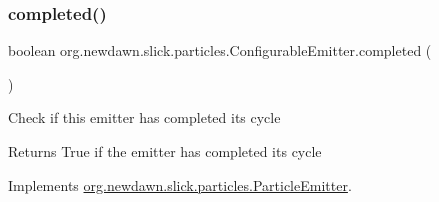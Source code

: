 \subsubsection{\texorpdfstring{completed()}{completed()}}
{\footnotesize\ttfamily boolean org.\+newdawn.\+slick.\+particles.\+Configurable\+Emitter.\+completed (\begin{DoxyParamCaption}{ }\end{DoxyParamCaption})\hspace{0.3cm}{\ttfamily [inline]}}

Check if this emitter has completed it\textquotesingle{}s cycle

\begin{DoxyReturn}{Returns}
True if the emitter has completed it\textquotesingle{}s cycle 
\end{DoxyReturn}


Implements \mbox{\hyperlink{interfaceorg_1_1newdawn_1_1slick_1_1particles_1_1_particle_emitter_a6741f9cbee46594a774b1bfd24a4bf3d}{org.\+newdawn.\+slick.\+particles.\+Particle\+Emitter}}.


